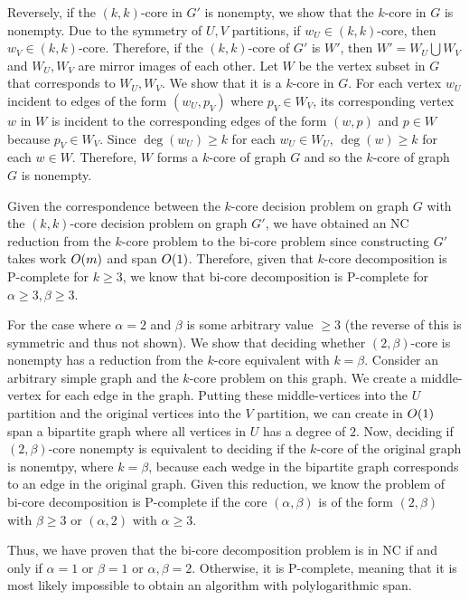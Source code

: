 Reversely, if the $(k,k)$-core in $G'$ is nonempty, we show that the $k$-core in $G$ is nonempty. Due to the symmetry of $U,V$ partitions, if $w_U\in (k,k)$-core, then $w_V\in (k,k)$-core. Therefore, if the $(k,k)$-core of $G'$ is $W'$, then $W' = W_U \bigcup W_V$ and $W_U, W_V$ are mirror images of each other. Let $W$ be the vertex subset in $G$ that corresponds to $W_U, W_V$. We show that it is a $k$-core in $G$. For each vertex $w_U$ incident to edges of the form $(w_U, p_V)$ where $p_V\in W_V$, its corresponding vertex $w$ in $W$ is incident to the corresponding edges of the form $(w,p)$ and $p\in W$ because $p_V\in W_V$. Since $\deg(w_U)\ge k$ for each $w_U\in W_U$, $\deg(w)\ge k$ for each $w\in W$. Therefore, $W$ forms a $k$-core of graph $G$ and so the $k$-core of graph $G$ is nonempty. 

Given the correspondence between the $k$-core decision problem on graph $G$ with the $(k,k)$-core decision problem on graph $G'$, we have obtained an NC reduction from the $k$-core problem to the bi-core problem since constructing $G'$ takes work $O(m)$ and span $O(1)$. Therefore, given that $k$-core decomposition is P-complete for $k\ge 3$, we know that bi-core decomposition is P-complete for $\alpha\ge 3, \beta\ge 3$.

For the case where $\alpha=2$ and $\beta$ is some arbitrary value $\ge 3$ (the reverse of this is symmetric and thus not shown). We show that deciding whether $(2,\beta)$-core is nonempty has a reduction from the $k$-core equivalent with $k=\beta$. Consider an arbitrary simple graph and the $k$-core problem on this graph. We create a middle-vertex for each edge in the graph. Putting these middle-vertices into the $U$ partition and the original vertices into the $V$ partition, we can create in $O(1)$ span a bipartite graph where all vertices in $U$ has a degree of $2$. Now, deciding if $(2,\beta)$-core nonempty is equivalent to deciding if the $k$-core of the original graph is nonemtpy, where $k=\beta$, because each wedge in the bipartite graph corresponds to an edge in the original graph. Given this reduction, we know the problem of bi-core decomposition is P-complete if the core $(\alpha,\beta)$ is of the form $(2,\beta)$ with $\beta\ge 3$ or $(\alpha,2)$ with $\alpha\ge 3$.

Thus, we have proven that the bi-core decomposition problem is in NC if and only if $\alpha= 1$ or $\beta= 1$ or $\alpha,\beta = 2$. Otherwise, it is P-complete, meaning that it is most likely impossible to obtain an algorithm with polylogarithmic span.
